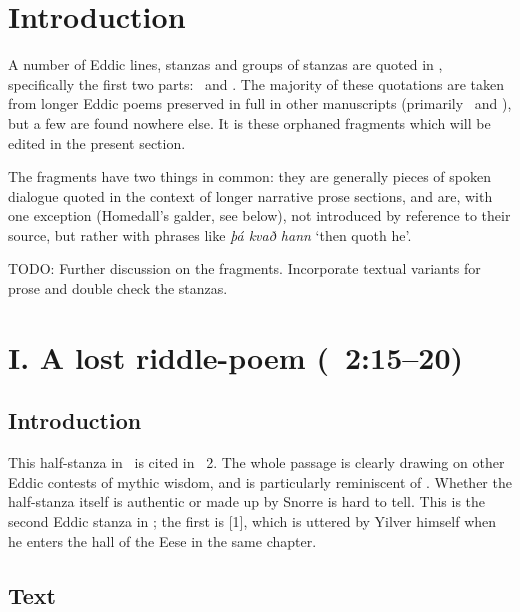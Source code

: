 
\section{Introduction}

A number of Eddic lines, stanzas and groups of stanzas are quoted in \SnorraEdda, specifically the first two parts: \Gylfaginning\ and \Skaldskaparmal.  The majority of these quotations are taken from longer Eddic poems preserved in full in other manuscripts (primarily \Regius\ and \AM), but a few are found nowhere else.  It is these orphaned fragments which will be edited in the present section.

The fragments have two things in common: they are generally pieces of spoken dialogue quoted in the context of longer narrative prose sections, and are, with one exception (Homedall’s galder, see below), not introduced by reference to their source, but rather with phrases like \emph{þá kvað hann} ‘then quoth he’.

TODO: Further discussion on the fragments.  Incorporate textual variants for prose and double check the stanzas.

\sectionline

\newpage

\section{I. A lost riddle-poem (\Gylfaginning~2:15--20)}\chapterStart%
%

\subsection{Introduction}

This half-stanza in \Ljodahattr\ is cited in \Gylfaginning~2.  The whole passage is clearly drawing on other Eddic contests of mythic wisdom, and is particularly reminiscent of .  Whether the half-stanza itself is authentic or made up by Snorre is hard to tell.
This is the second Eddic stanza in \Gylfaginning; the first is [1], which is uttered by Yilver himself when he enters the hall of the Eese in the same chapter.

\subsection{Text}

